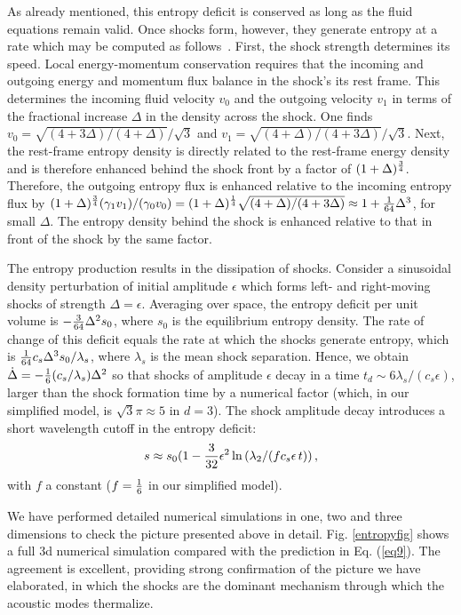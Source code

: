 \documentclass[prl,aps,10pt,twocolumn,showkeys,nofootinbib]{revtex4-1}
\def\be{\begin{equation}}
\def\ee{\end{equation}}
\begin{document}
 As already mentioned, this entropy deficit is conserved as long as the fluid equations remain valid. Once shocks form, however, they generate entropy at a rate which may be computed as follows~\cite{LL2}. First, the shock strength determines its speed. Local energy-momentum conservation requires that the incoming and outgoing energy and momentum flux balance in the shock's its rest frame. This determines the incoming fluid velocity $v_0$ and the outgoing velocity $v_1$ in terms of the fractional increase $\Delta$ in the density across the shock. One finds  $v_0=\sqrt{(4+3 \Delta)/(4+\Delta)}/\sqrt{3}$ and $v_1=\sqrt{(4+\Delta)/( 4+3 \Delta)}/\sqrt{3}$.  Next, the rest-frame entropy density is directly related to the rest-frame energy density and is therefore enhanced behind the shock front by a factor of $(1+\Delta)^{3\over 4}$. Therefore, the outgoing entropy flux is enhanced relative to the incoming entropy flux by $(1+\Delta)^{3\over 4} (\gamma_1 v_1)/(\gamma_0 v_0) = (1+\Delta)^{1\over 4} \sqrt{(4+\Delta)/(4+3\Delta)}\approx 1 +{1\over 64} \Delta^3$, for small $\Delta$. The entropy density behind the shock is enhanced relative to that in front of the shock by the same factor.  


The entropy production results in the dissipation of shocks. Consider a sinusoidal density perturbation of initial amplitude $\epsilon$ which forms left- and right-moving shocks of strength $\Delta= \epsilon$. Averaging over space, the entropy deficit per unit volume is $-{3\over 64}\Delta^2 s_0$, where $s_0$ is the equilibrium entropy density. The rate of change of this deficit equals the rate at which the shocks generate entropy, which is ${1\over 64}c_s \Delta^3 s_0/\lambda_s$, where $\lambda_s$ is the mean shock separation. Hence, we obtain $\dot{\Delta}=-{1\over 6} (c_s/\lambda_s) \Delta^2$ so that shocks of amplitude $\epsilon$ decay in a time $t_d\sim 6 \lambda_s/(c_s \epsilon)$, larger than the shock formation time by a numerical factor (which, in our simplified model, is $\sqrt{3} \pi\approx 5$ in $d=3$). The shock amplitude decay introduces a short wavelength cutoff in the entropy deficit:
\be
s\approx s_0(1 -{3\over 32} \epsilon^2 \ln\left(\lambda_{2}/(f c_s \epsilon\, t)\right), 
\label{eq9}
\ee
with $f$ a constant ($f={1\over 6}$ in our simplified model). 

We have performed detailed numerical simulations in one, two and three dimensions to check the picture presented above in detail. Fig. \ref{entropyfig} shows a full 3d numerical simulation compared with the prediction in Eq. (\ref{eq9}). The agreement is excellent, providing strong confirmation of the picture we have elaborated, in which the shocks are the dominant mechanism through which the acoustic modes thermalize. 
\end{document}
